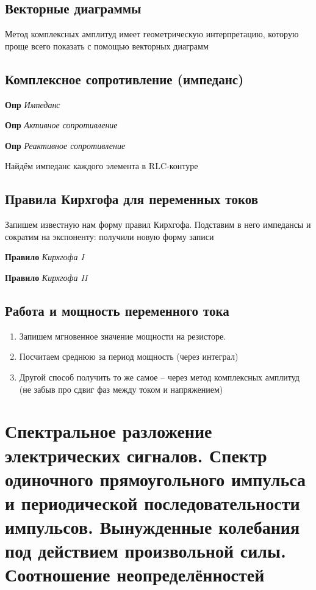 \documentclass[a4paper, 14pt]{article}
\begin{document}
    \subsection{Векторные диаграммы}
    
    Метод комплексных амплитуд имеет геометрическую интерпретацию, которую проще всего показать с помощью векторных
    диаграмм
    
    \subsection{Комплексное сопротивление (импеданс)}
    
    \textbf{Опр} \textit{Импеданс}
    
    \textbf{Опр} \textit{Активное сопротивление}
    
    \textbf{Опр} \textit{Реактивное сопротивление}
    
    Найдём импеданс каждого элемента в RLC-контуре
    
    \subsection{Правила Кирхгофа для переменных токов}
    
    Запишем известную нам форму правил Кирхгофа.
    Подставим в него импедансы и сократим на экспоненту: получили новую форму записи
    
    \textbf{Правило} \textit{Кирхгофа I}
    
    \textbf{Правило} \textit{Кирхгофа II}
    
    \subsection{Работа и мощность переменного тока}
    
    \begin{enumerate}
        \item Запишем мгновенное значение мощности на резисторе.
        \item Посчитаем среднюю за период мощность (через интеграл)
        \item Другой способ получить то же самое -- через метод комплексных амплитуд (не забыв про сдвиг фаз между
        током и напряжением)
    \end{enumerate}
    
    \section{Спектральное разложение электрических сигналов.
    Спектр одиночного прямоугольного импульса и периодической последовательности импульсов.
    Вынужденные колебания под действием произвольной силы.
    Соотношение неопределённостей}
    
\end{document}
